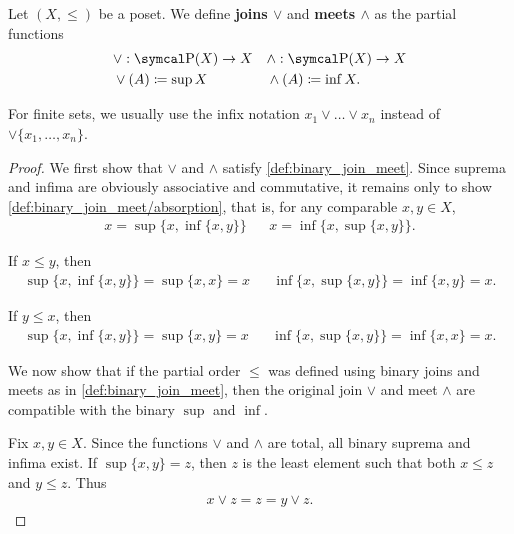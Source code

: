 \begin{definition}\label{def:join_meet}
  Let \( (X, \leq) \) be a poset. We define \textbf{joins \( \lor \)} and \textbf{meets \( \land \)} as the partial functions
  \begin{align*}
    &\lor: \Power(X) \to X
    &&\land: \Power(X) \to X
    \\
    &\lor(A) \coloneqq \sup X
    &&\land(A) \coloneqq \inf X.
  \end{align*}

  For finite sets, we usually use the infix notation \( x_1 \lor \ldots \lor x_n \) instead of \( \lor \{ x_1, \ldots, x_n \} \).
\end{definition}
\begin{proof}
  We first show that \( \lor \) and \( \land \) satisfy \cref{def:binary_join_meet}. Since suprema and infima are obviously associative and commutative, it remains only to show \ref{def:binary_join_meet/absorption}, that is, for any comparable \( x, y \in X \),
  \begin{align*}
    x = \sup \{x, \inf \{ x, y \} \}
    &&
    x = \inf \{x, \sup \{ x, y \} \}.
  \end{align*}

  If \( x \leq y \), then
  \begin{align*}
    \sup \{ x, \inf \{ x, y \} \} = \sup \{ x, x \} = x
    &&
    \inf \{ x, \sup \{ x, y \} \} = \inf \{ x, y \} = x.
  \end{align*}

  If \( y \leq x \), then
  \begin{align*}
    \sup \{ x, \inf \{ x, y \} \} = \sup \{ x, y \} = x
    &&
    \inf \{ x, \sup \{ x, y \} \} = \inf \{ x, x \} = x.
  \end{align*}

  We now show that if the partial order \( \leq \) was defined using binary joins and meets as in \cref{def:binary_join_meet}, then the original join \( \lor \) and meet \( \land \) are compatible with the binary \( \sup \) and \( \inf \).

  Fix \( x, y \in X \). Since the functions \( \lor \) and \( \land \) are total, all binary suprema and infima exist. If \( \sup \{ x, y \} = z \), then \( z \) is the least element such that both \( x \leq z \) and \( y \leq z \). Thus
  \begin{align*}
    x \lor z = z = y \lor z.
  \end{align*}


\end{proof}

